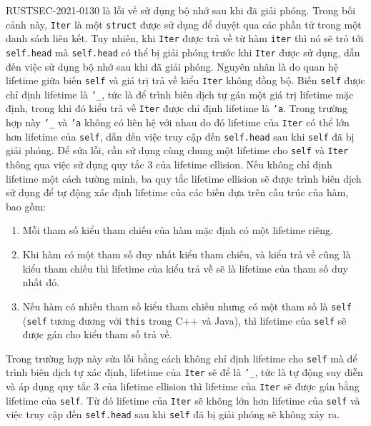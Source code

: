 RUSTSEC-2021-0130 là lỗi về sử dụng bộ nhớ sau khi đã giải phóng.
Trong bối cảnh này, \texttt{Iter} là một \texttt{struct} được sử dụng để duyệt qua các phần tử trong một danh sách liên kết.
Tuy nhiên, khi \texttt{Iter} được trả về từ hàm \texttt{iter} thì nó sẽ trỏ tới \texttt{self.head} mà \texttt{self.head} có thể bị giải phóng trước khi \texttt{Iter} được sử dụng, dẫn đến việc sử dụng bộ nhớ sau khi đã giải phóng.
Nguyên nhân là do quan hệ lifetime giữa biến \texttt{self} và giá trị trả về kiểu \texttt{Iter} không đồng bộ.
Biến \texttt{self} được chỉ định lifetime là \texttt{'\_}, tức là để trình biên dịch tự gán một giá trị lifetime mặc định, trong khi đó kiểu trả về \texttt{Iter} được chỉ định lifetime là \texttt{'a}.
Trong trường hợp này \texttt{'\_} và \texttt{'a} không có liên hệ với nhau do đó lifetime của \texttt{Iter} có thể lớn hơn lifetime của \texttt{self}, dẫn đến việc truy cập đến \texttt{self.head} sau khi \texttt{self} đã bị giải phóng.
Để sửa lỗi, cần sử dụng cùng chung một lifetime cho \texttt{self} và \texttt{Iter} thông qua việc sử dụng quy tắc 3 của lifetime ellision.
Nếu không chỉ định lifetime một cách tường minh, ba quy tắc lifetime ellision sẽ được trình biên dịch sử dụng để tự động xác định lifetime của các biến dựa trên cấu trúc của hàm, bao gồm:

\begin{enumerate}
    \item Mỗi tham số kiểu tham chiếu của hàm mặc định có một lifetime riêng.
    \item Khi hàm có một tham số duy nhất kiểu tham chiếu, và kiểu trả về cũng là kiểu tham chiếu thì lifetime của kiểu trả về sẽ là lifetime của tham số duy nhất đó.
    \item Nếu hàm có nhiều tham số kiểu tham chiếu nhưng có một tham số là \texttt{self} (\texttt{self} tương đương với \texttt{this} trong C++ và Java), thì lifetime của \texttt{self} sẽ được gán cho kiểu tham số trả về.
\end{enumerate}

Trong trường hợp này sửa lỗi bằng cách không chỉ định lifetime cho \texttt{self} mà để trình biên dịch tự xác định, lifetime của \texttt{Iter} sẽ để là \texttt{'\_}, tức là tự động suy diễn và áp dụng quy tắc 3 của lifetime ellision thì lifetime của \texttt{Iter} sẽ được gán bằng lifetime của \texttt{self}.
Từ đó lifetime của \texttt{Iter} sẽ không lớn hơn lifetime của \texttt{self} và việc truy cập đến \texttt{self.head} sau khi \texttt{self} đã bị giải phóng sẽ không xảy ra.

